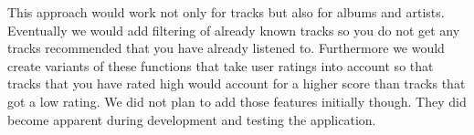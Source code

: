 This approach would work not only for tracks but also for albums and artists. Eventually we would add filtering of already known tracks so you do not get any tracks recommended that you have already listened to. Furthermore we would create variants of these functions that take user ratings into account so that tracks that you have rated high would account for a higher score than tracks that got a low rating. We did not plan to add those features initially though. They did become apparent during development and testing the application.
